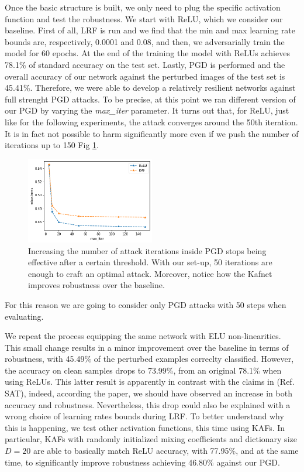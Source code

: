 \documentclass[LaM,binding=0.6cm]{./packages/sapthesis/sapthesis}
\begin{document}
        Once the basic structure is built, we only need to plug the specific activation function and test the robustness.
        We start with ReLU, which we consider our baseline. First of all, LRF is run and we find that the min and max learning rate bounds are,
        respectively, 0.0001 and 0.08, and then, we adversarially train the model for 60 epochs. At the end of the training the model with ReLUs achieves 78.1\% of standard accuracy 
        on the test set. Lastly, PGD is performed and the overall accuracy of our network against the perturbed images of the test set is 45.41\%. Therefore, we were able to
        develop a relatively resilient networks against full strenght PGD attacks. To be precise, 
        at this point we ran different version of our PGD by varying the \textit{max\_iter} parameter. It turns out that, for ReLU, just like for 
        the following experiments, the attack converges around the 50th iteration. It is in fact not possible to harm significantly more even if we push 
        the number of iterations up to 150 Fig \ref{fig:pgditers}.
        \begin{figure}[h!]
            \centering
            \includegraphics[width=0.50\textwidth]{pgditers.png}
            \caption{Increasing the number of attack iterations inside PGD stops being effective after a certain threshold. With our set-up, 50 iterations are enough to craft an 
            optimal attack. Moreover, notice how the Kafnet improves robustness over the baseline. }
            \label{fig:pgditers}
        \end{figure}
        For this reason we are going to consider only PGD attacks with 50 steps when evaluating.

        We repeat the process equipping the same network with ELU non-linearities. This small change results in a minor improvement over the baseline in terms of robustness, with 45.49\% 
        of the perturbed examples correclty classified. However, the accuracy on clean samples drops to 73.99\%, from an original 78.1\% when using ReLUs. This latter result is 
        apparently in contrast with the claims in (Ref. SAT), indeed, according the paper, we should have observed an increase in both accuracy and robustness. Nevertheless, this drop could also be explained with a wrong choice of learning rates bounds during LRF. 
        To better understand why this is happening, we test other activation functions, this time using KAFs. In particular, KAFs with randomly initialized mixing 
        coefficients and dictionary size $D=20$ are able to basically match ReLU accuracy, with 77.95\%, and at the same time, to significantly improve robustness achieving 46.80\%
        against our PGD.
\end{document}
